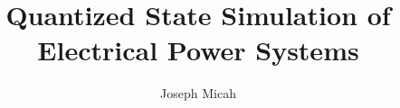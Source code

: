 \documentclass{uscthesis}
\title{Quantized State Simulation of Electrical Power Systems}
\author{Joseph Micah}{Hood}
\begin{document}





















	


\Appendix  


\end{document}
